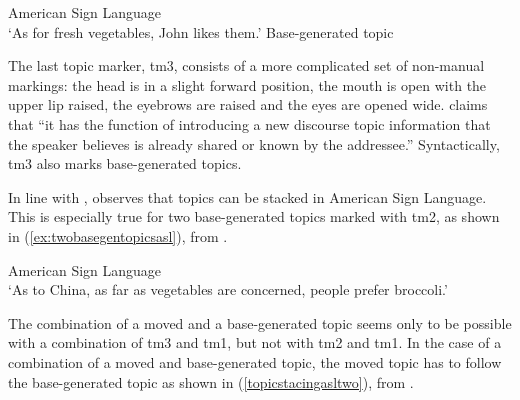 \clearpage


\begin{exe}
\ex American Sign Language \\  
\glt `As for fresh vegetables, John likes them.' \label{ex:topicaaronscnewmoved} \hfill Base-generated topic
\end{exe} 

\noindent The last topic marker, tm3, consists of a more complicated set of non-manual markings: the head is in a slight forward position, the mouth is open with the upper lip raised, the eyebrows are raised and the eyes are opened wide. \citet[81]{aarons1996topics} claims that ``it has the function of introducing a new discourse topic information that the speaker believes is already shared or known by the addressee.'' Syntactically, tm3 also marks base-generated topics.

In line with \citet{rizzi1997fine}, \citet{aarons1996topics} observes that topics can be stacked in American Sign Language. This is especially true for two base-generated topics marked with tm2, as shown in (\ref{ex:twobasegentopicsasl}), from \citet[90]{aarons1996topics}.

\begin{exe}
\ex American Sign Language  \\   
\glt `As to China, as far as vegetables are concerned, people prefer broccoli.' \label{ex:twobasegentopicsasl} 
\end{exe} 

\noindent The combination of a moved and a base-generated topic seems only to be possible with a combination of tm3 and tm1, but not with tm2 and tm1. In the case of a combination of a moved and base-generated topic, the moved topic has to follow the base-generated topic as shown in (\ref{topicstacingasltwo}), from \citet[94]{aarons1996topics}.

